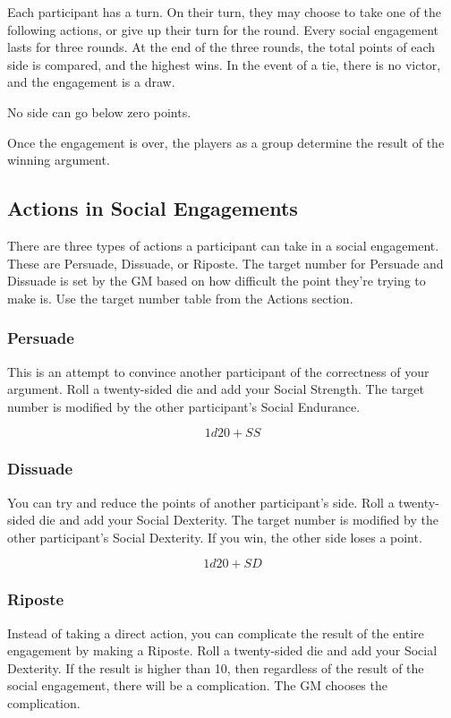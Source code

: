 \begin{multicols}{2}
Each participant has a turn. On their turn, they may choose to take one of the
following actions, or give up their turn for the round. Every social engagement
lasts for three rounds. At the end of the three rounds, the total points of each
side is compared, and the highest wins. In the event of a tie, there is no
victor, and the engagement is a draw.

No side can go below zero points.

Once the engagement is over, the players as a group determine the result of the winning argument.

\subsection{Actions in Social Engagements}

There are three types of actions a participant can take in a social engagement.
These are Persuade, Dissuade, or Riposte. The target number for Persuade and
Dissuade is set by the GM based on how difficult the point they're trying to
make is. Use the target number table from the Actions section.

\subsubsection{Persuade}

This is an attempt to convince another participant of the correctness of your argument. Roll a
twenty-sided die and add your Social Strength. The target number is modified by the other
participant's Social Endurance.

$$1d20 + SS$$

\subsubsection{Dissuade}

You can try and reduce the points of another participant's side. Roll a twenty-sided die
and add your Social Dexterity. The target number is modified by the other participant's
Social Dexterity. If you win, the other side loses a point.

$$1d20 + SD$$

\subsubsection{Riposte}

Instead of taking a direct action, you can complicate the result of the entire engagement
by making a Riposte. Roll a twenty-sided die and add your Social Dexterity. If the result
is higher than 10, then regardless of the result of the social engagement, there will be
a complication. The GM chooses the complication.


\end{multicols}
